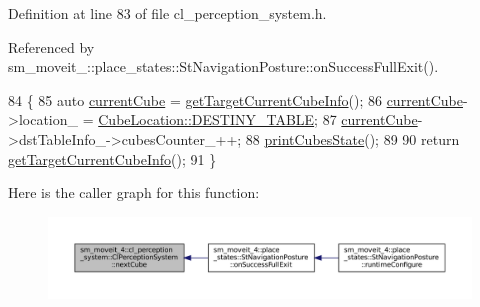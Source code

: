 Definition at line 83 of file cl\+\_\+perception\+\_\+system.\+h.



Referenced by sm\+\_\+moveit\+\_\+::place\+\_\+states\+::\+St\+Navigation\+Posture\+::on\+Success\+Full\+Exit().


\begin{DoxyCode}
84             \{
85                 \textcolor{keyword}{auto} \hyperlink{classsm__moveit__4_1_1cl__perception__system_1_1ClPerceptionSystem_ae2a80b803814af8b3c87f810f2728af0}{currentCube} = \hyperlink{classsm__moveit__4_1_1cl__perception__system_1_1ClPerceptionSystem_ac4b944cebb2055a85a33129665df5dcf}{getTargetCurrentCubeInfo}();
86                 \hyperlink{classsm__moveit__4_1_1cl__perception__system_1_1ClPerceptionSystem_ae2a80b803814af8b3c87f810f2728af0}{currentCube}->location\_ = \hyperlink{namespacesm__moveit__4_1_1cl__perception__system_a0d1b8834532a7cf9d19670791eece6d1acdc3fdda18904b4a1ac0be036c86f973}{CubeLocation::DESTINY\_TABLE};
87                 \hyperlink{classsm__moveit__4_1_1cl__perception__system_1_1ClPerceptionSystem_ae2a80b803814af8b3c87f810f2728af0}{currentCube}->dstTableInfo\_->cubesCounter\_++;
88                 \hyperlink{classsm__moveit__4_1_1cl__perception__system_1_1ClPerceptionSystem_a70ec0058531af470ab52268bd6540ddd}{printCubesState}();
89 
90                 \textcolor{keywordflow}{return} \hyperlink{classsm__moveit__4_1_1cl__perception__system_1_1ClPerceptionSystem_ac4b944cebb2055a85a33129665df5dcf}{getTargetCurrentCubeInfo}();
91             \}
\end{DoxyCode}
Here is the caller graph for this function\+:
\nopagebreak
\begin{figure}[H]
\begin{center}
\leavevmode
\includegraphics[width=350pt]{classsm__moveit__4_1_1cl__perception__system_1_1ClPerceptionSystem_ab9ee8563cf55a88b34e81a2281da996f_icgraph}
\end{center}
\end{figure}
\mbox{\label{classsm__moveit__4_1_1cl__perception__system_1_1ClPerceptionSystem_a70ec0058531af470ab52268bd6540ddd}} 
